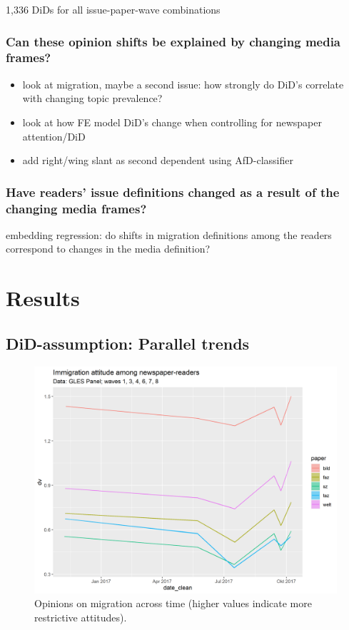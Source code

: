 \documentclass{article}
\begin{document}
1,336 DiDs for all issue-paper-wave combinations

\subsubsection{Can these opinion shifts be explained by changing media frames?}

\begin{itemize}
    \item look at migration, maybe a second issue: how strongly do DiD's correlate with changing topic prevalence?
    \item look at how FE model DiD's change when controlling for newspaper attention/DiD
    \item add right/wing slant as second dependent using AfD-classifier
\end{itemize}


\subsubsection{Have readers' issue definitions changed as a result of the changing media frames?}

embedding regression: do shifts in migration definitions among the readers correspond to changes in the media definition?

\section{Results}

\subsection{DiD-assumption: Parallel trends}

\begin{figure}[!h]
    \centering
    \includegraphics[width=\textwidth]{paper/vis/Immigration_papers.png}
    \caption{Opinions on migration across time (higher values indicate more restrictive attitudes).}
    \label{fig:issues}
\end{figure}
    
\end{document}
